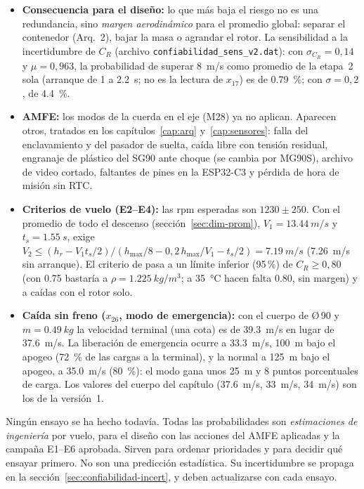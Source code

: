 \begin{nota}
\begin{itemize}[leftmargin=*,nosep]
  \item \textbf{Consecuencia para el diseño:} lo que más baja el riesgo no es una redundancia, sino \emph{margen aerodinámico} para el promedio
        global: separar el contenedor (Arq.~2), bajar la masa o agrandar el rotor. La sensibilidad a la incertidumbre de $C_R$ (archivo
        \texttt{confiabilidad\_sens\_v2.dat}): con $\sigma_{C_R}=0{,}14$ y $\mu=0{,}963$, la probabilidad de superar \SI{8}{m/s} como promedio de la etapa~2 sola
        (arranque de 1 a \SI{2.2}{s}; no es la lectura de $x_{17}$) es de \SI{0.79}{\percent};
        con $\sigma=0{,}2$, de \SI{4.4}{\percent}.
  \item \textbf{AMFE:} los modos de la cuerda en el eje (M28) ya no aplican. Aparecen otros, tratados en los capítulos~\ref{cap:arq} y~\ref{cap:sensores}: falla del
        enclavamiento y del pasador de suelta, caída libre con tensión residual, engranaje de plástico del SG90 ante choque
        (se cambia por MG90S), archivo de video cortado, faltantes de pines en la ESP32-C3 y pérdida de hora de misión sin RTC.
  \item \textbf{Criterios de vuelo (E2--E4):} las rpm esperadas son $\num{1230}\pm\num{250}$. Con el promedio de todo el descenso
        (sección~\ref{sec:dim-prom}), $V_1=\SI{13.44}{m/s}$ y $t_s=\SI{1.55}{s}$,  exige
        $V_2\le(h_r-V_1t_s/2)/(h_{\max}/8-0{,}2\,h_{\max}/V_1-t_s/2)=\SI{7.19}{m/s}$ (\SI{7.26}{m/s} sin arranque). El criterio de 
        pasa a un límite inferior (95\,\%) de $C_R\ge0{,}80$ (con \num{0.75} bastaría a $\rho=\SI{1.225}{kg/m^3}$; a \SI{35}{\celsius}
        hacen falta \num{0.80}, sin margen) y a caídas con el rotor solo.
  \item \textbf{Caída sin freno ($x_{26}$, modo de emergencia):} con el cuerpo de Ø\,90 y
        $m=\SI{0.49}{kg}$ la velocidad terminal (una cota) es de \SI{39.3}{m/s} en lugar de \SI{37.6}{m/s}. La
        liberación de emergencia ocurre a \SI{33.3}{m/s}, \SI{100}{m} bajo el apogeo (\SI{72}{\percent} de
        las cargas a la terminal), y la normal a \SI{125}{m} bajo el apogeo, a \SI{35.0}{m/s}
        (\SI{80}{\percent}): el modo gana unos \SI{25}{m} y 8 puntos porcentuales de carga. Los valores del
        cuerpo del capítulo (\SI{37.6}{m/s}, \SI{33}{m/s}, \SI{34}{m/s}) son los de la versión~1.
\end{itemize}
\end{nota}

\begin{nota}
Ningún ensayo se ha hecho todavía. Todas las probabilidades son \emph{estimaciones de
ingeniería} por vuelo, para el diseño con las acciones del AMFE aplicadas y la campaña
E1--E6 aprobada. Sirven para ordenar prioridades y para decidir qué ensayar primero. No
son una predicción estadística. Su incertidumbre se propaga en la
sección~\ref{sec:confiabilidad-incert}, y deben actualizarse con cada ensayo.
\end{nota}

